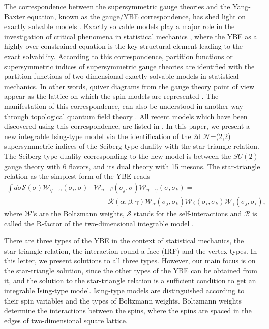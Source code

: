 \documentclass[a4paper,11pt]{article}%
\numberwithin{equation}{section}
\begin{document}
 The correspondence between the supersymmetric  gauge theories and  the  Yang-Baxter equation, known as the gauge/YBE correspondence, has shed light on exactly solvable models \cite{Yamazaki:2013nra}. Exactly solvable models play a major role in the investigation of critical phenomena in statistical mechanics \cite{baxter2007exactly}, where the YBE as a highly over-constrained equation is the key structural element leading to the exact solvability.
 According to this  correspondence, partition functions or supersymmetric indices of supersymmetric gauge theories are identified with the partition functions of two-dimensional exactly solvable models in statistical mechanics. In other words, quiver diagrams from the gauge theory point of view appear as the lattice on which the spin  models are represented \cite{Yamazaki:2013nra}. The manifestation of this correspondence, can also be understood in another way through topological quantum field theory \cite{Yagi:2015lha}.  All recent models which have been discovered using this correspondence, are listed in \cite{Jafarzade-2017}.
 In this paper, we present a new integrable Ising-type model via the identification of the 2d $\mathcal{N}$=(2,2) supersymmetric indices of the Seiberg-type duality with the star-triangle relation. The Seiberg-type duality corresponding to the new model is between the $SU(2)$ gauge theory with 6 flavors, and its dual theory with 15 mesons. The star-triangle relation as the simplest form of the YBE reads
  \begin{align}\label{Strr}
     \int d \sigma \mathcal{S}( \sigma ) \mathcal{W}_{\eta-\alpha}(\sigma _{i},\sigma)& \mathcal{W}_{\eta - \beta}( \sigma _{j}, \sigma) \mathcal{W}_{ \eta - \gamma}( \sigma , \sigma_{k})=\\\nonumber
    & \qquad \mathcal{R}(\alpha , \beta,\gamma)\mathcal{W}_{ \alpha }( \sigma _{j}, \sigma_{k})\mathcal{W}_{ \beta}( \sigma _{i}, \sigma_{k})\mathcal{W}_{ \gamma}( \sigma _{j}, \sigma_{i}),
\end{align}
where $\mathcal{W}$'s are the Boltzmann weights, $\mathcal{S}$ stands for the self-interactions and $\mathcal{R}$ is called the R-factor of the two-dimensional integrable model \cite{Bazhanov:2016ajm,Baxter:1997tn}.

There are three types of the YBE in the context of statistical mechanics, the star-triangle relation, the interaction-round-a-face (IRF) and the vertex types. In this letter, we present solutions to all three types. However, our main focus is on the star-triangle solution, since the other types of the YBE can be obtained from it, and the solution to the star-triangle relation is a sufficient condition to get an integrable Ising-type model. Ising-type models are distinguished according to their spin variables and the types of Boltzmann weights. Boltzmann weights determine the interactions between the spins, where the spins  are spaced in the edges of two-dimensional square lattice.
\end{document}
